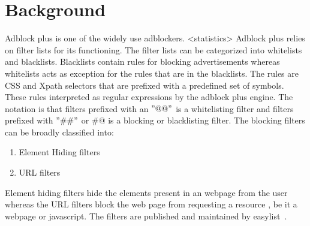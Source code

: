 \section{Background}
Adblock plus is one of the widely use adblockers.  <statistics>
Adblock plus relies  on filter lists for  its functioning.
The filter lists can be categorized into whitelists and blacklists.
Blacklists contain rules for blocking advertisements whereas whitelists acts as exception for the rules that are in the blacklists.
The rules are CSS and Xpath selectors that are prefixed with a predefined set of symbols.
These rules interpreted as regular expressions by the adblock plus engine.
The notation is that filters prefixed with an $"@@"$ is a whitelisting filter and  filters prefixed with $"\#\#"$
or $\#@$  is  a blocking or blacklisting filter.
The blocking filters can be broadly classified into:
\begin{enumerate}
\item Element Hiding filters
\item URL filters
\end{enumerate}
Element hiding filters hide the elements present in an webpage from the user whereas the URL filters block the web page from requesting a resource , be it a webpage or javascript.
The filters are  published and maintained by easylist~\cite{easylist}.